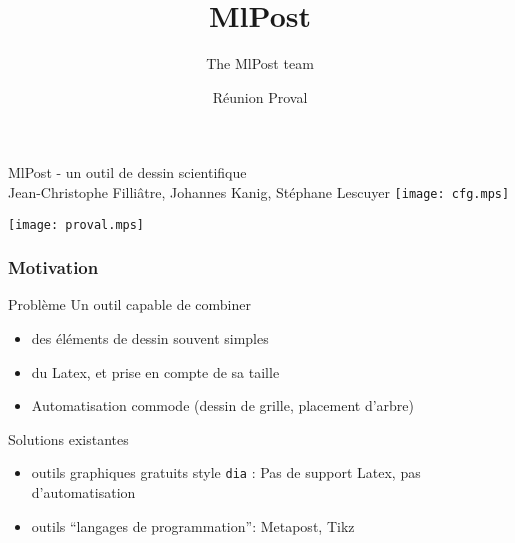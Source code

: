 \documentclass[nodefaultblocks]{beamer}
\title{MlPost}
\author{The MlPost team}
\institute{Proval}
\date{Réunion Proval}
\begin{document}
\begin{frame}
  
  \begin{center}
    {\huge{MlPost - un outil de dessin scientifique}}\\[2em]
    {\large \alert{Jean-Christophe Filli\^atre, Johannes Kanig, St\'ephane Lescuyer}}
    \medskip
    \hfill\texttt{[image: cfg.mps]}
  \end{center}
  \hfill\texttt{[image: proval.mps]}
\end{frame}

\begin{frame}\frametitle{Motivation}

  \begin{block}{Problème}
    Un outil capable de combiner
    \begin{itemize}
      \item des éléments de dessin souvent simples
      \item du Latex, et prise en compte de sa taille
      \item Automatisation commode (dessin de grille, placement d'arbre)
    \end{itemize}
  \end{block}

  \begin{block}{Solutions existantes}
    \begin{itemize}
      \item outils graphiques gratuits style {\tt dia} : Pas de support Latex,
        pas d'automatisation
      \item outils ``langages de programmation'': Metapost, Tikz
    \end{itemize}
  \end{block}
\end{frame}
\end{document}
